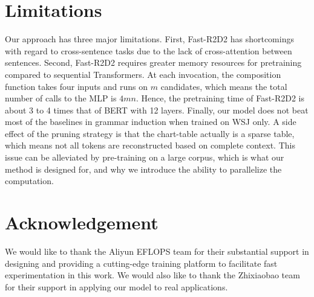 \documentclass[11pt,a4paper]{article}
\begin{document}
\section{Limitations}
Our approach has three major limitations. First, Fast-R2D2 has shortcomings with regard to cross-sentence tasks due to the lack of cross-attention between sentences. Second, Fast-R2D2 requires greater memory resources for pretraining compared to sequential Transformers.  At each invocation, the composition function takes four inputs and runs on $m$ candidates, which means the total number of calls to the MLP is $4mn$. Hence, the pretraining time of  Fast-R2D2 is about 3 to 4 times that of BERT with 12 layers. Finally, our model does not beat most of the baselines in grammar induction when trained on WSJ only. A side effect of the pruning strategy is that the chart-table actually is a sparse table, which means not all tokens are reconstructed based on complete context.  This issue can be alleviated by pre-training on a large corpus, which is what our method is designed for, and why we introduce the ability to parallelize the computation.

\section{Acknowledgement}
We would like to thank the Aliyun EFLOPS team for their substantial support in designing and providing a cutting-edge training platform to facilitate fast experimentation in this work. We would also like to thank the Zhixiaobao team for their support in applying our model to real applications.

\newpage
 


\onecolumn

\end{document}
